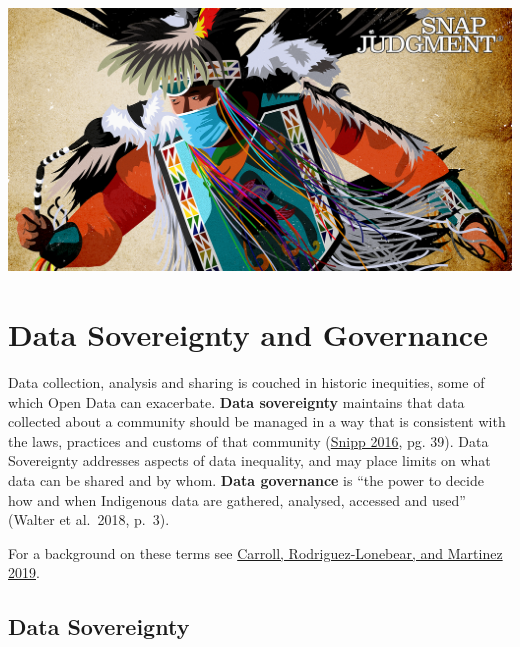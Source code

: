 \documentclass[
]{book}
\begin{document}
\includegraphics{images/CensusPowwow.png}

\hypertarget{data-sovereignty-and-governance}{%
\chapter{Data Sovereignty and Governance}\label{data-sovereignty-and-governance}}

Data collection, analysis and sharing is couched in historic inequities, some of which Open Data can exacerbate. \textbf{Data sovereignty} maintains that data collected about a community should be managed in a way that is consistent with the laws, practices and customs of that community (\href{https://static1.squarespace.com/static/5d2633cb0ef5e4000134fa02/t/5d7a7610da91c0143184a9d1/1568306712324/Indigenous\%2BData\%2BSovereignty\%2BBook.pdf}{Snipp 2016}, pg. 39). Data Sovereignty addresses aspects of data inequality, and may place limits on what data can be shared and by whom. \textbf{Data governance} is ``the power to decide how and when Indigenous data are gathered, analysed, accessed and used'' (Walter et al.~2018, p.~3).

For a background on these terms see \href{https://datascience.codata.org/articles/10.5334/dsj-2019-031/}{Carroll, Rodriguez-Lonebear, and Martinez 2019}.

\hypertarget{data-sovereignty}{%
\section{Data Sovereignty}\label{data-sovereignty}}
\end{document}

